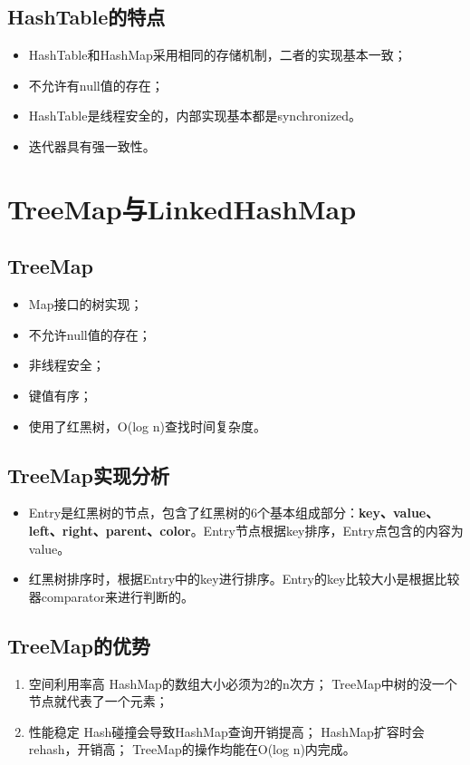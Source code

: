 \subsection{HashTable的特点}
\begin{itemize}
	\item HashTable和HashMap采用相同的存储机制，二者的实现基本一致；
	\item 不允许有null值的存在；
	\item HashTable是线程安全的，内部实现基本都是synchronized。
	\item 迭代器具有强一致性。
\end{itemize}

\section{TreeMap与LinkedHashMap}
\subsection{TreeMap}
\begin{itemize}
	\item Map接口的树实现；
	\item 不允许null值的存在；
	\item 非线程安全；
	\item 键值有序；
	\item 使用了红黑树，O(log n)查找时间复杂度。
\end{itemize}
\subsection{TreeMap实现分析}
\begin{itemize}
	\item Entry是红黑树的节点，包含了红黑树的6个基本组成部分：\textbf{key、value、left、right、parent、color}。Entry节点根据key排序，Entry点包含的内容为value。
	\item 红黑树排序时，根据Entry中的key进行排序。Entry的key比较大小是根据比较器comparator来进行判断的。
\end{itemize}
\subsection{TreeMap的优势}
\begin{enumerate}
	\item 空间利用率高
	\subitem HashMap的数组大小必须为2的n次方；
	\subitem TreeMap中树的没一个节点就代表了一个元素；
	\item 性能稳定
	\subitem Hash碰撞会导致HashMap查询开销提高；
	\subitem HashMap扩容时会rehash，开销高；
	\subitem TreeMap的操作均能在O(log n)内完成。
\end{enumerate}
